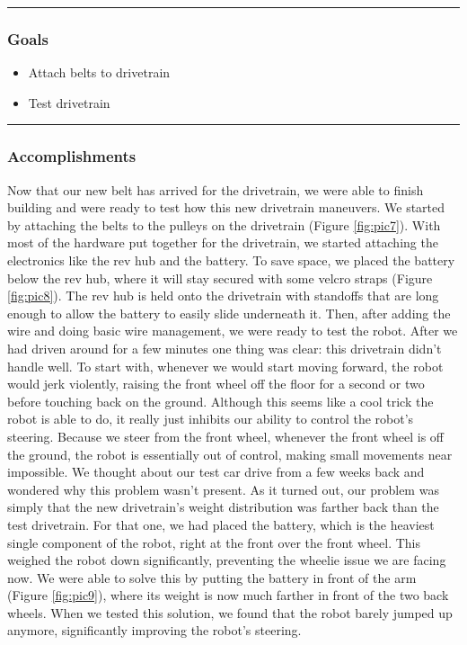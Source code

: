 \noindent\hfil\rule{\textwidth}{.4pt}\hfil
\subsubsection*{Goals}
\begin{itemize}
    \item Attach belts to drivetrain
	\item Test drivetrain


\end{itemize} 

\noindent\hfil\rule{\textwidth}{.4pt}\hfil

\subsubsection*{Accomplishments}
Now that our new belt has arrived for the drivetrain, we were able to finish building and were ready to test how this new drivetrain maneuvers. We started by attaching the belts to the pulleys on the drivetrain (Figure \ref{fig:pic7}). With most of the hardware put together for the drivetrain, we started attaching the electronics like the rev hub and the battery. To save space, we placed the battery below the rev hub, where it will stay secured with some velcro straps (Figure \ref{fig:pic8}). The rev hub is held onto the drivetrain with standoffs that are long enough to allow the battery to easily slide underneath it. Then, after adding the wire and doing basic wire management, we were ready to test the robot.
After we had driven around for a few minutes one thing was clear: this drivetrain didn’t handle well. To start with, whenever we would start moving forward, the robot would jerk violently, raising the front wheel off the floor for a second or two before touching back on the ground. Although this seems like a cool trick the robot is able to do, it really just inhibits our ability to control the robot's steering. Because we steer from the front wheel, whenever the front wheel is off the ground, the robot is essentially out of control, making small movements near impossible. We thought about our test car drive from a few weeks back and wondered why this problem wasn’t present. As it turned out, our problem was simply that the new drivetrain’s weight distribution was farther back than the test drivetrain. For that one, we had placed the battery, which is the heaviest single component of the robot, right at the front over the front wheel. This weighed the robot down significantly, preventing the wheelie issue we are facing now. We were able to solve this by putting the battery in front of the arm (Figure \ref{fig:pic9}), where its weight is now much farther in front of the two back wheels. When we tested this solution, we found that the robot barely jumped up anymore, significantly improving the robot’s steering.

